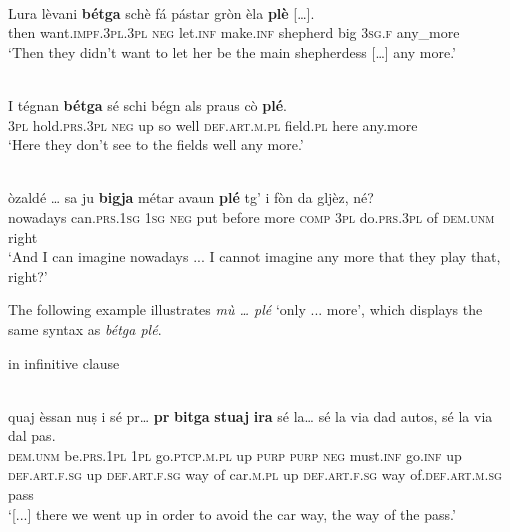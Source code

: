 \ea
\label{}
 {\citealt[119]{Büchli1966}}\\
\gll    Lura lèvani \textbf{bétga} schè fá pástar gròn èla \textbf{plè} […].\\
     then want.\textsc{impf.3pl.3pl} \textsc{neg} let.\textsc{inf} make.\textsc{inf} shepherd big \textsc{3sg.f} any\_more\\
\glt `Then they didn’t want to let her be the main shepherdess […] any more.'
\z

\ea\label{}
\\
\gll   I tégnan \textbf{bétga} sé schi bégn als praus cò \textbf{plé}. \\
     \textsc{3pl} hold.\textsc{prs.3pl} \textsc{neg} up so well \textsc{def.art.m.pl} field.\textsc{pl} here any.more \\
\glt `Here they don’t see to the fields well any more.'
\z

\ea
\label{}
\\
	\gll [...] òzaldé … sa ju \textbf{bigja} métar avaun \textbf{plé} tg’ i fòn da gljèz, né?    \\
{} nowadays {} can.\textsc{prs.1sg} \textsc{1sg} \textsc{neg} put before more \textsc{comp} \textsc{3pl} do.\textsc{prs.3pl} of \textsc{dem.unm} right \\
\glt `And I can imagine nowadays ... I cannot imagine any more that they play that, right?'
\z



The following example illustrates \textit{mù … plé} `only ... more', which displays the same syntax as \textit{bétga plé}.



in infinitive clause

\ea\label{}
\\
\gll  [...] quaj èssan nuṣ i sé pr… \textbf{pr} \textbf{bitga} \textbf{stuaj} \textbf{ira} sé la… sé la via dad autos, sé la via dal pas. \\
{} \textsc{dem.unm} be.\textsc{prs.1pl} \textsc{1pl} go.\textsc{ptcp.m.pl} up \textsc{purp} \textsc{purp} \textsc{neg} must.\textsc{inf} go.\textsc{inf} up \textsc{def.art.f.sg} up \textsc{def.art.f.sg} way of car.\textsc{m.pl} up \textsc{def.art.f.sg} way of.\textsc{def.art.m.sg} pass  \\
\glt `[...] there we went up in order to avoid the car way, the way of the pass.'
\z



